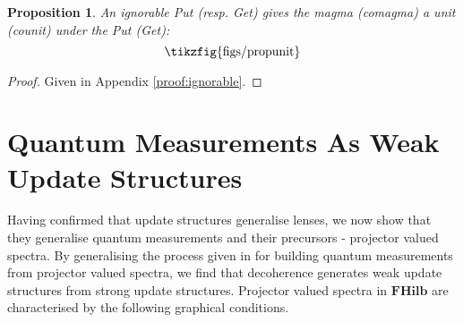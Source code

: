 \documentclass[submission,copyright,creativecommons,sharealike,noncommercial]{eptcs}
\newcommand{\tikzfigscale}[2]{\scalebox{#1}{\tikzfig{#2}}}
\newcommand{\fhilb}{\textbf{FHilb}}
\newcommand{\putt}[1]{\mathbin{\uparrow_{#1}}}
\newcommand{\get}[1]{\operatorname{\text{\faEye}}_{#1}}
\newcommand{\mix}[1]{\sim_{#1}}
\newcommand{\copyy}[1]{
\mathbin{\begin{tikzpicture}
		\node [style={black_dot}, scale=0.6] (0) at (0, 0) {};
		\node [style=none] (1) at (0, -0.2) {};
		\node [style=none] (2) at (-0.2, 0.2) {};
		\node [style=none] (3) at (0.2, 0.2) {};
		\draw (1.center) to (0);
		\draw [in=-90, out=150] (0) to (2.center);
		\draw [in=270, out=30] (0) to (3.center);
\end{tikzpicture}}_{\hspace{-0.05cm}#1}}
\newcommand{\frob}[1]{
\mathbin{\begin{tikzpicture}
	\begin{pgfonlayer}{nodelayer}
		\node [style={black_dot}, scale=0.6] (0) at (0, 0) {};
		\node [style=none] (1) at (0, 0.2) {};
		\node [style=none] (2) at (-0.2, -0.2) {};
		\node [style=none] (3) at (0.2, -0.2) {};
	\end{pgfonlayer}
	\begin{pgfonlayer}{edgelayer}
		\draw (1.center) to (0);
		\draw [in=90, out=-150] (0) to (2.center);
		\draw [in=-270, out=-30] (0) to (3.center);
	\end{pgfonlayer}
\end{tikzpicture}}_{\hspace{-0.05cm}#1}}
\theoremstyle{definition}
\theoremstyle{plain}
\newtheorem{prop}{Proposition}
\theoremstyle{plain}
\begin{document}
\begin{prop}\label{prop:ignorable}
    An ignorable Put (resp. Get) gives the magma (comagma) a unit (counit) under the Put (Get):
    \begin{equation*}
    \tikzfigscale{1}{figs/propunit}
    \end{equation*}
\end{prop}
\begin{proof}
Given in Appendix \ref{proof:ignorable}.
\end{proof}






\section{Quantum Measurements As Weak Update Structures}
Having confirmed that update structures generalise lenses, we now show that they generalise quantum measurements and their precursors - projector valued spectra. By generalising the process given in \cite{coecke_measurements} for building quantum measurements from projector valued spectra, we find that decoherence generates weak update structures from strong update structures. Projector valued spectra in $\fhilb$ are characterised by the following graphical conditions.
\end{document}
